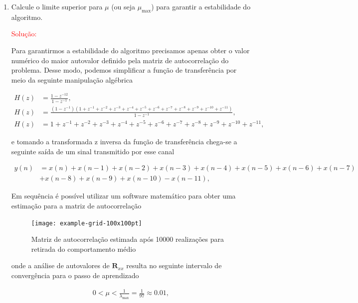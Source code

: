 \begin{enumerate}

    \item Calcule o limite superior para $\mu$ (ou seja $\mu_{\text{max}}$) para garantir a estabilidade do algoritmo.

        \textcolor{red}{Solução:}

        Para garantirmos a estabilidade do algoritmo precisamos apenas obter o valor numérico do maior autovalor definido pela matriz de autocorrelação do problema.
        Desse modo, podemos simplificar a função de transferência por meio da seguinte manipulação algébrica

        \begin{align*}
            H(z) &= \frac{1 - z^{-12}}{1 - z^{-1}}, \\
            H(z) &= \frac{(1 - z^{-1})(1 + z^{-1} + z^{-2} + z^{-3} + z^{-4} + z^{-5} + z^{-6} + z^{-7} + z^{-8} + z^{-9} + z^{-10} + z^{-11})}{1 - z^{-1}}, \\
            H(z) &= 1 + z^{-1} + z^{-2} + z^{-3} + z^{-4} + z^{-5} + z^{-6} + z^{-7} + z^{-8} + z^{-9} + z^{-10} + z^{-11},
        \end{align*}

        e tomando a transformada z inversa da função de transferência chega-se a seguinte saída de um sinal transmitido por esse canal

        \begin{align*}
            y(n) &= x(n) + x(n-1) + x(n-2) + x(n-3) + x(n-4) + x(n-5) + x(n-6) + x(n-7) \\
            &+ x(n-8) + x(n-9) + x(n-10) - x(n-11), 
        \end{align*}

        Em sequência é possível utilizar um software matemático para obter uma estimação para a matriz de autocorrelação

        \begin{figure}[!htp]
            \centering
            \texttt{[image: example-grid-100x100pt]}
        \caption{Matriz de autocorrelação estimada após 10000 realizações para retirada do comportamento médio}
        \label{fig:rxx}
        \end{figure}

        onde a análise de autovalores de $\mathbf{R}_{xx}$ resulta no seguinte intervalo de convergência para o passo de 
        aprendizado

        \begin{align}
            0 < \mu < \frac{1}{\lambda_{\text{max}}} = \frac{1}{97} \approx 0.01,
        \end{align}


\end{enumerate}
